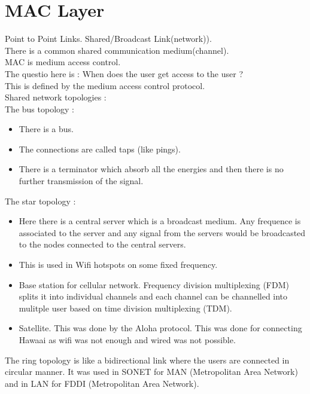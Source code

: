\documentclass[solution,addpoints,12pt]{exam}
\begin{document}
\section{MAC Layer}
Point to Point Links. Shared/Broadcast Link(network)).\\
There is a common shared communication medium(channel).\\
MAC is medium access control.\\
The questio here is : When does the user get access
to the user ?\\
This is defined by the medium access control protocol.\\

Shared network topologies :\\
The bus topology :\\
\begin{itemize}
\item There is a bus.
\item The connections are called taps (like pings).
\item There is a terminator which absorb all the energies
and then there is no further transmission of the signal.
\end{itemize}
The star topology :\\
\begin{itemize}
\item Here there is a central server which is
a broadcast medium. Any frequence is associated to the server
and any signal from the servers would be broadcasted to
the nodes connected to the central servers.
\item This is used in Wifi hotspots on some fixed frequency.
\item Base station for cellular network.
Frequency division multiplexing (FDM)
splits it into individual channels and each channel
can be channelled into mulitple user based on time division
multiplexing (TDM).
\item Satellite. This was done by the Aloha protocol.
This was done for connecting Hawaai as wifi was not enough and
wired was not possible.
\end{itemize}

The ring topology is like a bidirectional link
where the users are connected in circular manner.
It was used in SONET for MAN (Metropolitan Area Network)
and in LAN for FDDI (Metropolitan Area Network).\\
\end{document}
